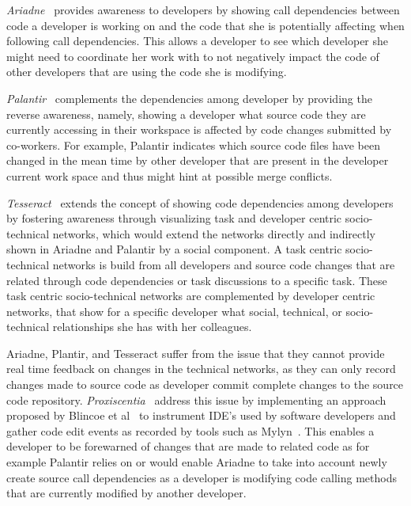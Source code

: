 \emph{Ariadne}~\cite{trainer2005:ariadne} provides awareness to developers by showing call dependencies between code a developer is working on and the code that she is potentially affecting when following call dependencies.
This allows a developer to see which developer she might need to coordinate her work with to not negatively impact the code of other developers that are using the code she is modifying.

\emph{Palantir}~\cite{sarma:cscw:2002} complements the dependencies among developer by providing the reverse awareness, namely, showing a developer what source code they are currently accessing in their workspace is affected by code changes submitted by co-workers.
For example, Palantir indicates which source code files have been changed in the mean time by other developer that are present in the developer current work space and thus might hint at possible merge conflicts.

\emph{Tesseract}~\cite{sarma:icse:2009} extends the concept of showing code dependencies among developers by fostering awareness through visualizing task and developer centric socio-technical networks, which would extend the networks directly and indirectly shown in Ariadne and Palantir by a social component.
A task centric socio-technical networks is build from all developers and source code changes that are related through code dependencies or task discussions to a specific task.
These task centric socio-technical networks are complemented by developer centric networks, that show for a specific developer what social, technical, or socio-technical relationships she has with her colleagues.

Ariadne, Plantir, and Tesseract suffer from the issue that they cannot provide real time feedback on changes in the technical networks, as they can only record changes made to source code as developer commit complete changes to the source code repository. 
\emph{Proxiscentia}~\cite{borici:chase:2012} address this issue by implementing an approach proposed by Blincoe et al~\cite{blincoe:cscw:2012} to instrument IDE's used by software developers and gather code edit events as recorded by tools such as Mylyn~\cite{kersten:aosd:2005}.
This enables a developer to be forewarned of changes that are made to related code as for example Palantir relies on or would enable Ariadne to take into account newly create source call dependencies as a developer is modifying code calling methods that are currently modified by another developer.

